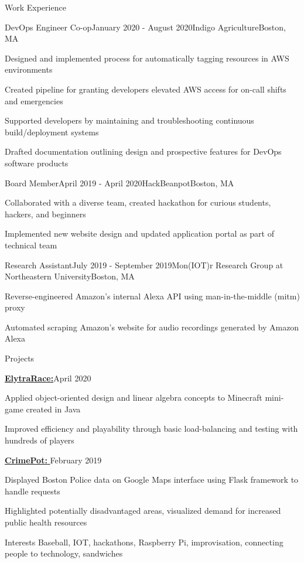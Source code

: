 \documentclass{resume}
\begin{document}
\begin{rSection}{Work Experience}

\begin{rSubsection}{DevOps Engineer Co-op}{January 2020 - August 2020}{Indigo Agriculture}{Boston, MA}
\item Designed and implemented process for automatically tagging resources in AWS environments
\item Created pipeline for granting developers elevated AWS access for on-call shifts and emergencies
\item Supported developers by maintaining and troubleshooting continuous build/deployment systems
\item Drafted documentation outlining design and prospective
 features for DevOps software products
\end{rSubsection}

\begin{rSubsection}{Board Member}{April 2019 - April 2020}{HackBeanpot}{Boston, MA}
\item Collaborated with a diverse team, created hackathon for curious students, hackers, and beginners
\item Implemented new website design and updated application portal as part of technical team
\end{rSubsection}

\begin{rSubsection}{Research Assistant}{July 2019 - September 2019}{Mon(IOT)r Research Group at Northeastern University}{Boston, MA}
\item Reverse-engineered Amazon's internal Alexa API using man-in-the-middle (mitm) proxy 
\item Automated scraping Amazon's website for audio recordings generated by Amazon Alexa
\end{rSubsection}
\end{rSection}

\begin{rSection}{Projects}

\begin{rSubsection}{\href{https://www.github.com/kyleposluns/elytrarace}{{\bf ElytraRace:}}}{April 2020}{}{}
\item Applied object-oriented design and linear algebra concepts to Minecraft mini-game created in Java
\item Improved efficiency and playability through basic load-balancing and testing with hundreds of players
\end{rSubsection}

\begin{rSubsection}{\href{https://www.devpost.com/software/CrimePot}{{\bf CrimePot:} }}{February 2019}{}{}
\item Displayed Boston Police data on Google Maps interface using Flask framework to handle requests
\item Highlighted potentially disadvantaged areas, visualized demand for increased public health resources 
\end{rSubsection}

\end{rSection}

\begin{rSection}{Interests}\itemsep -5pt
Baseball, IOT, hackathons, Raspberry Pi, improvisation, connecting people to technology, sandwiches
\end{rSection}
\end{document}
